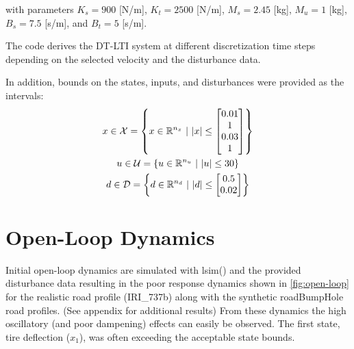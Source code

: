 \documentclass[]{IEEEtran}
\newcommand{\R}{\mathbb{R}}
\newcommand{\st}{ \ | \ }
\begin{document}
with parameters $K_s = 900$ [N/m], $K_t = 2500$ [N/m], $M_s = 2.45$ [kg], $M_u = 1$ [kg], $B_s = 7.5$ [s/m], and $B_t = 5$ [s/m].

The code derives the DT-LTI system at different discretization time steps depending on the selected velocity and the disturbance data.

In addition, bounds on the states, inputs, and disturbances were provided as the intervals:
\begin{gather*}
    x \in \mathcal{X} = \qty{x\in \R^{n_x} \st \abs{x} \leq \mqty[0.01\\1\\0.03\\1]}
    \\
    u \in \mathcal{U} = \qty{u \in \R^{n_u} \st \abs{u} \leq 30}
    \\
    d \in \mathcal{D} = \qty{d \in \R^{n_d} \st \abs{d} \leq \mqty[0.5\\0.02]}
\end{gather*}


\section{Open-Loop Dynamics}
Initial open-loop dynamics are simulated with lsim() and the provided disturbance data resulting in the poor response dynamics shown in \autoref{fig:open-loop} for the realistic road profile (IRI\_737b) along with the synthetic roadBumpHole road profiles.
(See appendix for additional results)
From these dynamics the high oscillatory (and poor dampening) effects can easily be observed.
The first state, tire deflection ($x_1$), was often exceeding the acceptable state bounds.
\end{document}
